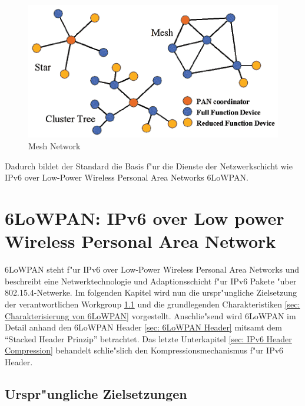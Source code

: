 \documentclass[final]{lktseminar}
\begin{document}
\begin{figure}[h]
    \centering
    \includegraphics[scale=0.7]{mesh_network.png}
    \caption{Mesh Network \cite{mesh_network_picture}}
    \label{fig:Mesh Network}
\end{figure}

Dadurch bildet der Standard die Basis f"ur die Dienste der Netzwerkschicht wie IPv6 over Low-Power Wireless Personal Area Networks 6LoWPAN.


\newpage

\section{6LoWPAN: IPv6 over Low power Wireless Personal Area Network}
\label{sec: 6LoWPAN: IPv6 over Low power Wireless Personal Area Network}

6LoWPAN steht f"ur IPv6 over Low-Power Wireless Personal Area Networks und beschreibt eine Netwerktechnologie
und Adaptionsschicht f"ur IPv6 Pakete "uber 802.15.4-Netwerke. Im folgenden Kapitel wird nun
die urspr"ungliche Zielsetzung der verantwortlichen Workgroup \ref{sec: Urspr"ungliche Zielsetzungen}
 und die grundlegenden Charakteristiken \ref{sec: Charakterisierung von 6LoWPAN} vorgestellt.
Anschlie"send wird 6LoWPAN im Detail anhand den 6LoWPAN Header \ref{sec: 6LoWPAN Header} mitsamt dem
``Stacked Header Prinzip'' betrachtet. Das letzte Unterkapitel \ref{sec: IPv6 Header Compression}
behandelt schlie"slich den Kompressionsmechanismus f"ur IPv6 Header.



\subsection{Urspr"ungliche Zielsetzungen}
\label{sec: Urspr"ungliche Zielsetzungen}
\end{document}
